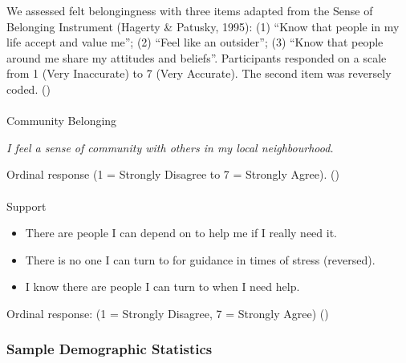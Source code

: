 \documentclass[
  single column]{article}
\makeatletter
\let\oldparagraph\paragraph
\renewcommand{\paragraph}{
    \@ifstar
      \xxxParagraphStar
      \xxxParagraphNoStar
  }
\newcommand{\xxxParagraphStar}[1]{\oldparagraph*{#1}\mbox{}}
\newcommand{\xxxParagraphNoStar}[1]{\oldparagraph{#1}\mbox{}}
\providecommand{\tightlist}{%
  \setlength{\itemsep}{0pt}\setlength{\parskip}{0pt}}\usepackage{longtable,booktabs,array}
\makeatother
\begin{document}
We assessed felt belongingness with three items adapted from the Sense
of Belonging Instrument (Hagerty \& Patusky, 1995): (1) ``Know that
people in my life accept and value me''; (2) ``Feel like an outsider'';
(3) ``Know that people around me share my attitudes and beliefs''.
Participants responded on a scale from 1 (Very Inaccurate) to 7 (Very
Accurate). The second item was reversely coded.
()

\paragraph{Community Belonging}\label{community-belonging}

\emph{I feel a sense of community with others in my local
neighbourhood.}

Ordinal response (1 = Strongly Disagree to 7 = Strongly Agree).
()

\paragraph{Support}\label{support}

\begin{itemize}
\tightlist
\item
  There are people I can depend on to help me if I really need it.
\item
  There is no one I can turn to for guidance in times of stress
  (reversed).
\item
  I know there are people I can turn to when I need help.
\end{itemize}

Ordinal response: (1 = Strongly Disagree, 7 = Strongly Agree)
()

\subsubsection{Sample Demographic
Statistics}\label{sample-demographic-statistics}

\begingroup\fontsize{6}{8}\selectfont
\begingroup\fontsize{6}{8}\selectfont
\end{document}
